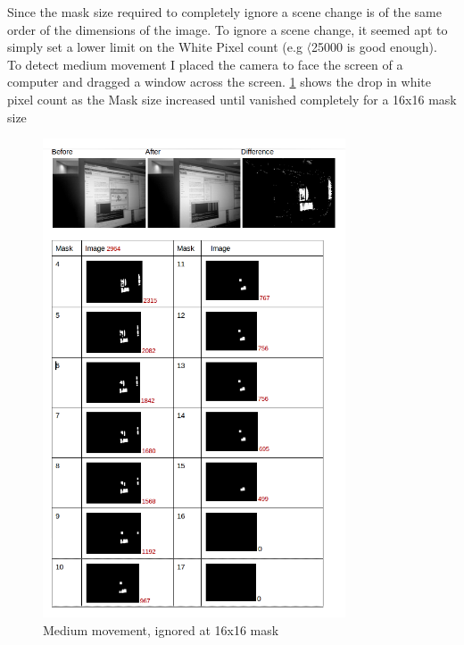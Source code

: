 {{Since the mask size required to completely ignore a scene change is of the same order of the dimensions of the image.  To ignore a scene change, it seemed apt to simply set a lower limit on the White Pixel count (e.g \(\langle\)25000 is good enough).
\\To detect medium movement I placed the camera to face the screen of a computer and dragged a window across the screen. \cref{img:medium} shows the drop in white pixel count as the Mask size increased until vanished completely for a 16x16 mask size
\begin{figure}[H]
	\vspace{-12pt}
	\begin{center}
		\includegraphics[width=0.8\textwidth]{../images/ImageOps/LARGE}
	\end{center}
	\vspace{-30pt}
	\caption{Medium movement, ignored at 16x16 mask}
	\label{img:medium}
	\vspace{-40pt}
\end{figure}

}}
